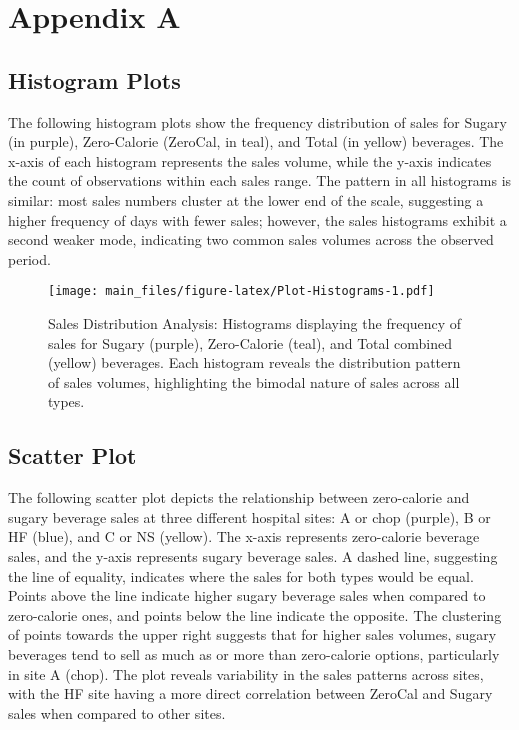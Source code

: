 \documentclass[
]{article}
\begin{document}
\pagebreak

\hypertarget{appendix-appendix}{%
\appendix}


\hypertarget{appendix-a}{%
\section{Appendix A}\label{appendix-a}}

\hypertarget{histogram-plots}{%
\subsection{Histogram Plots}\label{histogram-plots}}

The following histogram plots show the frequency distribution of sales for Sugary (in purple), Zero-Calorie (ZeroCal, in teal), and Total (in yellow) beverages. The x-axis of each histogram represents the sales volume, while the y-axis indicates the count of observations within each sales range. The pattern in all histograms is similar: most sales numbers cluster at the lower end of the scale, suggesting a higher frequency of days with fewer sales; however, the sales histograms exhibit a second weaker mode, indicating two common sales volumes across the observed period.

\begin{figure}
\centering
\texttt{[image: main\_files/figure-latex/Plot-Histograms-1.pdf]}
\caption{\label{fig:Plot-Histograms}Sales Distribution Analysis: Histograms displaying the frequency of sales for Sugary (purple), Zero-Calorie (teal), and Total combined (yellow) beverages. Each histogram reveals the distribution pattern of sales volumes, highlighting the bimodal nature of sales across all types.}
\end{figure}

\hypertarget{scatter-plot}{%
\subsection{Scatter Plot}\label{scatter-plot}}

The following scatter plot depicts the relationship between zero-calorie and sugary beverage sales at three different hospital sites: A or chop (purple), B or HF (blue), and C or NS (yellow). The x-axis represents zero-calorie beverage sales, and the y-axis represents sugary beverage sales. A dashed line, suggesting the line of equality, indicates where the sales for both types would be equal. Points above the line indicate higher sugary beverage sales when compared to zero-calorie ones, and points below the line indicate the opposite. The clustering of points towards the upper right suggests that for higher sales volumes, sugary beverages tend to sell as much as or more than zero-calorie options, particularly in site A (chop). The plot reveals variability in the sales patterns across sites, with the HF site having a more direct correlation between ZeroCal and Sugary sales when compared to other sites.
\end{document}
